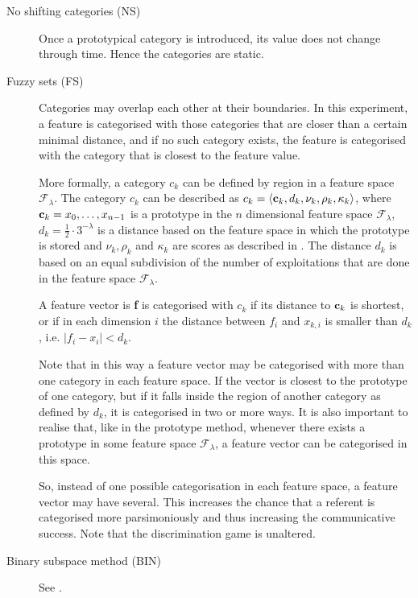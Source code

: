 \begin{description}
\item[No shifting categories (NS)] Once a prototypical category is introduced, its value does not change through time. Hence the categories are static.

\item[Fuzzy sets (FS)] Categories may overlap each other at their boundaries. In this experiment, a feature is categorised with those categories that are closer than a certain minimal distance, and if no such category exists, the feature is categorised with the category that is closest to the feature value. 

More formally, a category $c_k$ can be defined by region in a feature space ${\mathcal F}_\lambda$. The category $c_k$ can be described as $c_k=\langle {\bf c}_k,d_k,\nu_k,\rho_k,\kappa_k \rangle$, where ${\bf c}_k=x_0,\ldots,x_{n-1}$ is a prototype in the $n$ dimensional feature space ${\mathcal F}_\lambda$, $d_k=\frac{1}{2} \cdot 3^{-\lambda}$ is a distance based on the feature space in which the prototype is stored and $\nu_k, \rho_k$ and $\kappa_k$ are scores as described in . The distance $d_k$ is based on an equal subdivision of the number of exploitations that are done in the feature space ${\mathcal F}_\lambda$.

A feature vector is {\bf f} is categorised with $c_k$ if its distance to ${\bf c}_k$ is shortest, or if in each dimension $i$ the distance between $f_i$ and $x_{k,i}$ is smaller than $d_k$, i.e. $|f_i-x_i|<d_k$. 

Note that in this way a feature vector may be categorised with more than one category in each feature space. If the vector is closest to the prototype of one category, but if it falls inside the region of another category as defined by $d_k$, it is categorised in two or more ways. It is also important to realise that, like in the prototype method, whenever there exists a prototype in some feature space ${\mathcal F}_\lambda$, a feature vector can be categorised in this space.

So, instead of one possible categorisation in each feature space, a feature vector may have several. This increases the chance that a referent is categorised more parsimoniously and thus increasing the communicative success. Note that the discrimination game is unaltered.

\item[Binary subspace method (BIN)] See .
\end{description}

